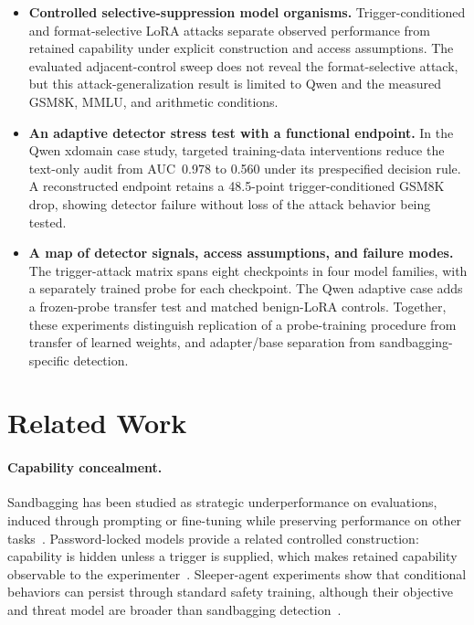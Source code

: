 \documentclass{article}
\begin{document}
\begin{itemize}
 \item \textbf{Controlled selective-suppression model organisms.} Trigger-conditioned and format-selective LoRA attacks separate observed performance from retained capability under explicit construction and access assumptions. The evaluated adjacent-control sweep does not reveal the format-selective attack, but this attack-generalization result is limited to Qwen and the measured GSM8K, MMLU, and arithmetic conditions.

 \item \textbf{An adaptive detector stress test with a functional endpoint.} In the Qwen xdomain case study, targeted training-data interventions reduce the text-only audit from AUC~0.978 to 0.560 under its prespecified decision rule. A reconstructed endpoint retains a 48.5-point trigger-conditioned GSM8K drop, showing detector failure without loss of the attack behavior being tested.

 \item \textbf{A map of detector signals, access assumptions, and failure modes.} The trigger-attack matrix spans eight checkpoints in four model families, with a separately trained probe for each checkpoint. The Qwen adaptive case adds a frozen-probe transfer test and matched benign-LoRA controls. Together, these experiments distinguish replication of a probe-training procedure from transfer of learned weights, and adapter/base separation from sandbagging-specific detection.
\end{itemize}

\section{Related Work}
\label{sec:related}

\paragraph{Capability concealment.}
Sandbagging has been studied as strategic underperformance on evaluations, induced through prompting or fine-tuning while preserving performance on other tasks~\citep{VanderWeij2024}. Password-locked models provide a related controlled construction: capability is hidden unless a trigger is supplied, which makes retained capability observable to the experimenter~\citep{Greenblatt2024}. Sleeper-agent experiments show that conditional behaviors can persist through standard safety training, although their objective and threat model are broader than sandbagging detection~\citep{Hubinger2024}.
\end{document}
